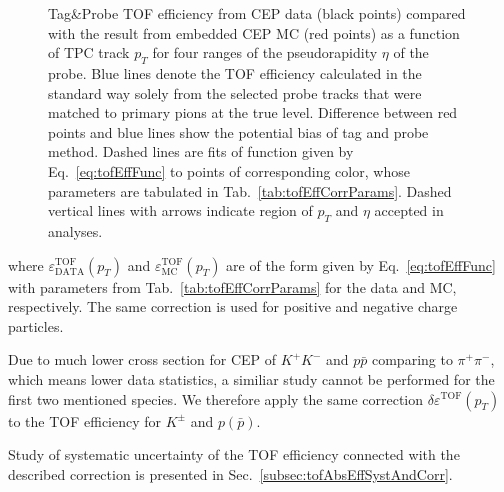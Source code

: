 \begin{figure}[H]
{\begin{subfigure}[b]{\linewidth}
  \end{subfigure}
}%
\caption[Tag\&Probe TOF efficiency from CEP data compared with the result from embedded CEP MC (divided w.r.t. $\eta$ of the probe).]%
    {Tag\&Probe TOF efficiency from CEP data (black points) compared with the result from embedded CEP MC (red points) as a function of TPC track $p_{T}$ for four ranges of the pseudorapidity $\eta$ of the probe. Blue lines denote the TOF efficiency calculated in the standard way solely from the selected probe tracks that were matched to primary pions at the true level. Difference between red points and blue lines show the potential bias of tag and probe method. Dashed lines are fits of function given by Eq.~\eqref{eq:tofEffFunc} to points of corresponding color, whose parameters are tabulated in Tab.~\ref{tab:tofEffCorrParams}. Dashed vertical lines with arrows indicate region of $p_{T}$ and $\eta$ accepted in analyses.}\label{fig:tofEffSyst_etaBins}%
\end{figure}%
%
%
%
%
\noindent where $\varepsilon^{\text{TOF}}_{\text{DATA}}(p_{T})$ and $\varepsilon^{\text{TOF}}_{\text{MC}}(p_{T})$ are of the form given by Eq.~\eqref{eq:tofEffFunc} with parameters from Tab.~\ref{tab:tofEffCorrParams} for the data and MC, respectively. The same correction is used for positive and negative charge particles.

Due to much lower cross section for CEP of $K^{+}K^{-}$ and $p\bar{p}$ comparing to $\pi^{+}\pi^{-}$, which means lower data statistics, a similiar study cannot be performed for the first two mentioned species. We therefore apply the same correction $\delta\varepsilon^{\text{TOF}}(p_{T})$ to the TOF efficiency for $K^{\pm}$ and $p(\bar{p})$.

Study of systematic uncertainty of the TOF efficiency connected with the described correction is presented in Sec.~\ref{subsec:tofAbsEffSystAndCorr}.
 

